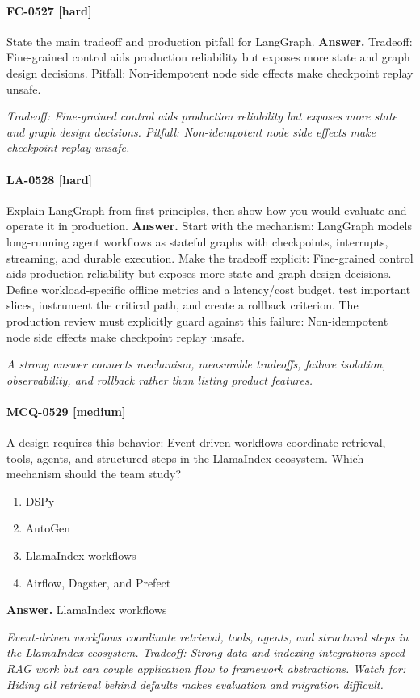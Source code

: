 \paragraph{FC-0527 [hard]} State the main tradeoff and production pitfall for LangGraph.
\noindent\textbf{Answer.} Tradeoff: Fine-grained control aids production reliability but exposes more state and graph design decisions. Pitfall: Non-idempotent node side effects make checkpoint replay unsafe.
\par\textit{Tradeoff: Fine-grained control aids production reliability but exposes more state and graph design decisions. Pitfall: Non-idempotent node side effects make checkpoint replay unsafe.}
\paragraph{LA-0528 [hard]} Explain LangGraph from first principles, then show how you would evaluate and operate it in production.
\noindent\textbf{Answer.} Start with the mechanism: LangGraph models long-running agent workflows as stateful graphs with checkpoints, interrupts, streaming, and durable execution. Make the tradeoff explicit: Fine-grained control aids production reliability but exposes more state and graph design decisions. Define workload-specific offline metrics and a latency/cost budget, test important slices, instrument the critical path, and create a rollback criterion. The production review must explicitly guard against this failure: Non-idempotent node side effects make checkpoint replay unsafe.
\par\textit{A strong answer connects mechanism, measurable tradeoffs, failure isolation, observability, and rollback rather than listing product features.}
\paragraph{MCQ-0529 [medium]} A design requires this behavior: Event-driven workflows coordinate retrieval, tools, agents, and structured steps in the LlamaIndex ecosystem. Which mechanism should the team study?
\begin{enumerate}[label=\Alph*.]
\item DSPy
\item AutoGen
\item LlamaIndex workflows
\item Airflow, Dagster, and Prefect
\end{enumerate}
\noindent\textbf{Answer.} LlamaIndex workflows
\par\textit{Event-driven workflows coordinate retrieval, tools, agents, and structured steps in the LlamaIndex ecosystem. Tradeoff: Strong data and indexing integrations speed RAG work but can couple application flow to framework abstractions. Watch for: Hiding all retrieval behind defaults makes evaluation and migration difficult.}
